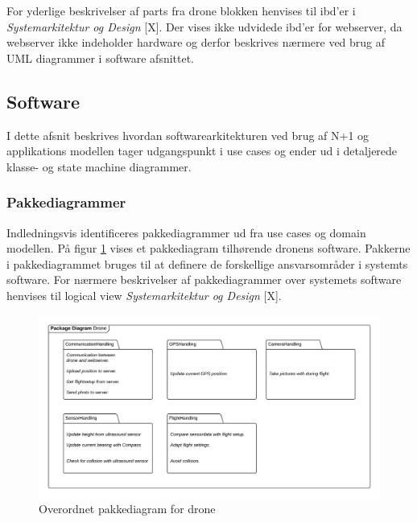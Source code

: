 For yderlige beskrivelser af parts fra drone blokken henvises til ibd'er i \textit{Systemarkitektur og Design} [X].
Der vises ikke udvidede ibd'er for webserver, da webserver ikke indeholder hardware og derfor beskrives nærmere ved brug af UML diagrammer i software afsnittet.



\newpage

\subsection{Software}

I dette afsnit beskrives hvordan softwarearkitekturen ved brug af N+1 og applikations modellen tager udgangspunkt i use cases og ender ud i detaljerede klasse- og state machine diagrammer. 
   
\subsubsection*{Pakkediagrammer}
\vspace{-0.3cm}	
Indledningsvis identificeres pakkediagrammer ud fra use cases og domain modellen. På figur \ref{fig:package_drone} vises et pakkediagram tilhørende dronens software. Pakkerne i pakkediagrammet bruges til at definere de forskellige ansvarsområder i systemts software. For nærmere beskrivelser af pakkediagrammer over systemets software henvises til logical view \textit{Systemarkitektur og Design} [X].
 
\begin{figure}[H]
	\centering
	\includegraphics[width=1\textwidth]{Billeder/Projektbeskrivelse/Packagediagram_drone}
	\vspace{-0.9cm}	
	\caption{Overordnet pakkediagram for drone}
	\label{fig:package_drone}
\end{figure}

